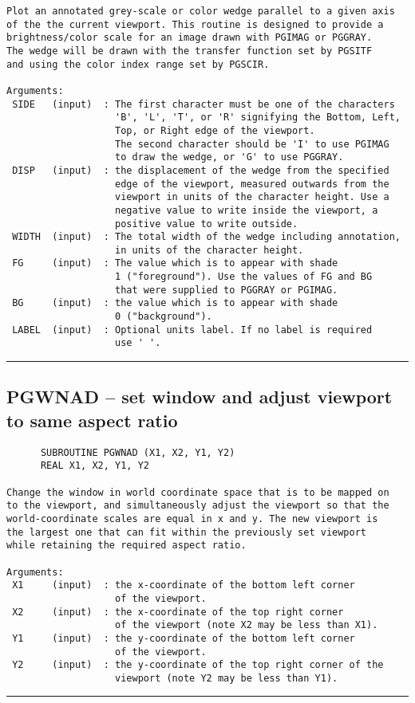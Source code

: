{\begin{verbatim}
Plot an annotated grey-scale or color wedge parallel to a given axis
of the the current viewport. This routine is designed to provide a
brightness/color scale for an image drawn with PGIMAG or PGGRAY.
The wedge will be drawn with the transfer function set by PGSITF
and using the color index range set by PGSCIR.

Arguments:
 SIDE   (input)  : The first character must be one of the characters
                   'B', 'L', 'T', or 'R' signifying the Bottom, Left,
                   Top, or Right edge of the viewport.
                   The second character should be 'I' to use PGIMAG
                   to draw the wedge, or 'G' to use PGGRAY.
 DISP   (input)  : the displacement of the wedge from the specified
                   edge of the viewport, measured outwards from the
                   viewport in units of the character height. Use a
                   negative value to write inside the viewport, a
                   positive value to write outside.
 WIDTH  (input)  : The total width of the wedge including annotation,
                   in units of the character height.
 FG     (input)  : The value which is to appear with shade
                   1 ("foreground"). Use the values of FG and BG
                   that were supplied to PGGRAY or PGIMAG.
 BG     (input)  : the value which is to appear with shade
                   0 ("background").
 LABEL  (input)  : Optional units label. If no label is required
                   use ' '.
\end{verbatim}
\hrule


\subsection*{PGWNAD -- set window and adjust viewport to same aspect ratio }
\begin{verbatim}
      SUBROUTINE PGWNAD (X1, X2, Y1, Y2)
      REAL X1, X2, Y1, Y2

Change the window in world coordinate space that is to be mapped on
to the viewport, and simultaneously adjust the viewport so that the
world-coordinate scales are equal in x and y. The new viewport is
the largest one that can fit within the previously set viewport
while retaining the required aspect ratio.

Arguments:
 X1     (input)  : the x-coordinate of the bottom left corner
                   of the viewport.
 X2     (input)  : the x-coordinate of the top right corner
                   of the viewport (note X2 may be less than X1).
 Y1     (input)  : the y-coordinate of the bottom left corner
                   of the viewport.
 Y2     (input)  : the y-coordinate of the top right corner of the
                   viewport (note Y2 may be less than Y1).
\end{verbatim}
\hrule


}

